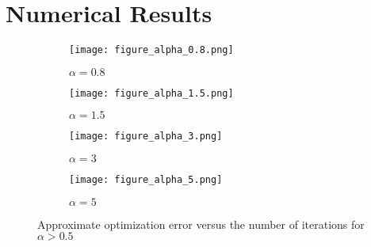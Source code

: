 \documentclass{article}
\begin{document}


\section{Numerical Results} \label{sec:numerics}

\begin{figure}[ht]
    \begin{subfigure}{.5\textwidth}
      \centering
      \texttt{[image: figure\_alpha\_0.8.png]}
      \caption{$\alpha=0.8$}
      \label{fig:sfig1}
    \end{subfigure}%
    \begin{subfigure}{.5\textwidth}
      \centering
      \texttt{[image: figure\_alpha\_1.5.png]}
      \caption{$\alpha=1.5$}
      \label{fig:sfig2}
    \end{subfigure}
    \begin{subfigure}{.5\textwidth}
      \centering
      \texttt{[image: figure\_alpha\_3.png]}
      \caption{$\alpha=3$}
      \label{fig:sfig3}
    \end{subfigure}
    \begin{subfigure}{.5\textwidth}
      \centering
      \texttt{[image: figure\_alpha\_5.png]}
      \caption{$\alpha=5$}
      \label{fig:sfig4}
    \end{subfigure}
    \caption{Approximate optimization error versus the number of iterations for $\alpha>0.5$}
    \label{fig1}
\end{figure}
\end{document}

